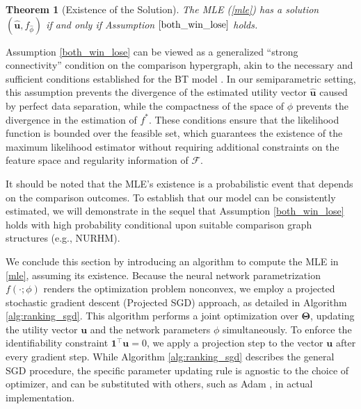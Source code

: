 \documentclass[
  12pt]{article}
\newtheorem{theorem}{Theorem}[section]
\begin{document}
\begin{theorem}[Existence of the Solution]
\label{theorem_existence}
The MLE (\ref{mle}) has a solution $(\widehat{\boldsymbol{u}}, f_{\widehat{\phi}})$ if and only if Assumption $\ref{both_win_lose}$ holds.
\end{theorem}

Assumption \ref{both_win_lose} can be viewed as a generalized ``strong connectivity'' condition on the comparison hypergraph, akin to the necessary and sufficient conditions established for the BT model \citep{zermelo1929berechnung, ford1957solution}. In our semiparametric setting, this assumption prevents the divergence of the estimated utility vector $\widehat{\boldsymbol{u}}$ caused by perfect data separation, while the compactness of the space of $\phi$ prevents the divergence in the estimation of $f^*$. These conditions ensure that the likelihood function is bounded over the feasible set, which guarantees the existence of the maximum likelihood estimator without requiring additional constraints on the feature space and regularity information of $\mathcal{F}$.

It should be noted that the MLE's existence is a probabilistic event that depends on the comparison outcomes. To establish that our model can be consistently estimated, we will demonstrate in the sequel that Assumption \ref{both_win_lose} holds with high probability conditional upon suitable comparison graph structures (e.g., NURHM).

We conclude this section by introducing an algorithm to compute the MLE in \eqref{mle}, assuming its existence. Because the neural network parametrization 
$f(\cdot; \phi)$ renders the optimization problem nonconvex, we employ a projected stochastic gradient descent (Projected SGD) approach, as detailed in Algorithm \ref{alg:ranking_sgd}.
This algorithm performs a joint optimization over $\boldsymbol{\Theta}$, updating the utility vector $\boldsymbol{u}$ and the network parameters $\phi$ simultaneously. To enforce the identifiability constraint $\mathbf{1}^\top \boldsymbol{u} = 0$, we apply a projection step to the vector $\boldsymbol{u}$ after every gradient step. While Algorithm \ref{alg:ranking_sgd} describes the general SGD procedure, the specific parameter updating rule is agnostic to the choice of optimizer, and can be substituted with others, such as Adam \citep{kingma2014adam}, in actual implementation.
\end{document}
